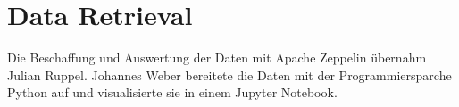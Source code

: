 \section{Data Retrieval}

Die Beschaffung und Auswertung der Daten mit Apache Zeppelin übernahm Julian Ruppel.
Johannes Weber bereitete die Daten mit der Programmiersparche Python auf und visualisierte sie in einem Jupyter Notebook.




